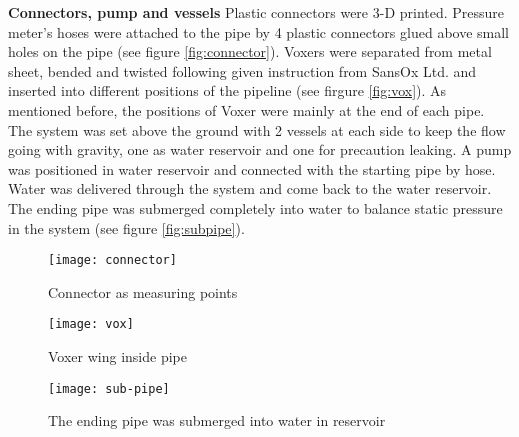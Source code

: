 \textbf{Connectors, pump and vessels}\newline
Plastic connectors were 3-D printed. Pressure meter’s hoses were attached to the pipe by 4 plastic connectors glued above small holes on the pipe (see figure \vref{fig:connector}). Voxers were separated from metal sheet, bended and twisted following given instruction from SansOx Ltd. and inserted into different positions of the pipeline (see firgure \vref{fig:vox}). As mentioned before, the positions of Voxer were mainly at the end of each pipe. The system was set above the ground with 2 vessels at each side to keep the flow going with gravity, one as water reservoir and one for precaution leaking. A pump was positioned in water reservoir and connected with the starting pipe by hose. Water was delivered through the system and come back to the water reservoir. The ending pipe was submerged completely into water to balance static pressure in the system (see figure \vref{fig:subpipe}).

\begin{figure}[!htb]
   \begin{minipage}{0.48\textwidth}
     \centering
     \texttt{[image: connector]}
     \caption{Connector as measuring points}\label{fig:connector}
   \end{minipage}\hfill
   \begin {minipage}{0.48\textwidth}
     \centering
     \texttt{[image: vox]}
     \caption{Voxer wing inside pipe}\label{fig:vox}
   \end{minipage}
\end{figure}
\begin{figure}[h]
  \centering
  \texttt{[image: sub-pipe]}
  \caption{ The ending pipe was submerged into water in reservoir}
  \label{fig:subpipe}
\end{figure}
